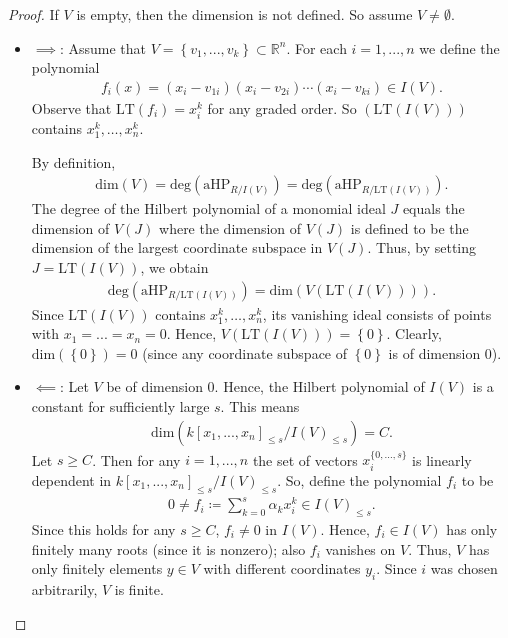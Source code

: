 \begin{proof}
  If \( V  \) is empty, then the dimension is not defined. So assume \( V \neq \emptyset \).

  \begin{itemize}
    \item \( \implies \): Assume that \( V = \left\{ v_1,...,v_k \right\} \subset \mathbb R^n \). For each \( i=1,...,n \) we define the polynomial 
    \begin{align*}
      f_i(x) = (x_i - v_{1i})(x_i -  v_{2i}) \cdots (x_i - v_{ki}) \in I(V).
    \end{align*}
    Observe that \( \mathrm{LT}(f_i) = x_i^k \) for any graded order. So \( (\mathrm{LT}(I(V))) \) contains \( x_1^k, \dots , x_n^k \).

    By definition, 
    \begin{align*}
      \mathrm{dim}(V) = \mathrm{deg}(\mathrm{aHP}_{R / I(V)}) =  \mathrm{deg}(\mathrm{aHP}_{R / \mathrm{LT}(I(V))}).
    \end{align*}
    The degree of the Hilbert polynomial of a monomial ideal \( J \) equals the dimension of \( V(J) \) where the dimension of \( V(J) \) is defined to be the dimension of the largest coordinate subspace in \( V(J) \). Thus, by setting \( J = \mathrm{LT}(I(V)) \), we obtain
    \begin{align*}
      \mathrm{deg}(\mathrm{aHP}_{R / \mathrm{LT}(I(V))}) = \mathrm{dim}(V(\mathrm{LT}(I(V)))).
    \end{align*}
    Since \( \mathrm{LT}(I(V)) \) contains \( x_1^k, \dots , x_n^k  \), its vanishing ideal consists of points with \( x_1 = ... = x_n = 0 \). Hence, \( V(\mathrm{LT}(I(V))) = \left\{ 0 \right\} \). Clearly, \( \mathrm{dim}(\left\{ 0 \right\}) = 0\) (since any coordinate subspace of \( \left\{ 0 \right\} \) is of dimension \( 0 \)).

    \item \( \impliedby \): Let \( V \) be of dimension \( 0 \). Hence, the Hilbert polynomial of \( I(V) \) is a constant for sufficiently large \( s \). This means 
    \begin{align*}
      \mathrm{dim}(k[x_1,...,x_n]_{\leq s} / I(V)_{\leq s}) = C.
    \end{align*}
    Let \( s \geq C \). Then for any \( i=1, ..., n \) the set of vectors \( x_i^{\{0, \dots, s\}} \) is linearly dependent in \( k[x_1,...,x_n]_{\leq s} / I(V)_{\leq s} \). So, define the polynomial \( f_i \) to be
    \begin{align*}
      0 \neq f_i \coloneqq \sum_{k=0}^s \alpha_k x_i^k \in I(V)_{\leq s}.
    \end{align*}    
    Since this holds for any \( s \geq C \), \( f_i \neq 0 \) in \( I(V) \). Hence, \( f_i \in I(V) \) has only finitely many roots (since it is nonzero); also \( f_i \) vanishes on \( V \). Thus, \( V \) has only finitely elements \( y \in V \) with different coordinates \( y_i \). Since \( i \) was chosen arbitrarily, \( V \) is finite.
  \end{itemize}
\end{proof}